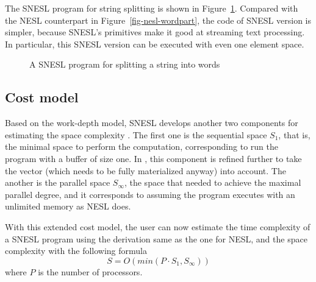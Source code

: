The SNESL program for string splitting is shown in Figure~\ref{fig-snesl-wordpart}. 
Compared with the NESL counterpart in Figure~\ref{fig-nesl-wordpart}, the code of SNESL version is simpler, because SNESL's primitives make it good at streaming text processing. 
In particular, this SNESL version can be executed with even one element space.
 
\begin{figure}[H]
	 
	\caption{{A SNESL program for splitting a string into words \label{fig-snesl-wordpart}}}
\end{figure}


\subsection{Cost model}

Based on the work-depth model, SNESL develops another two components for estimating the space complexity \cite{MadFil13}. 
The first one is the sequential space $S_1$, that is, the minimal space to perform the computation, corresponding to run the program with a buffer of size one. 
In \cite{Fphd}, this component is refined further to take the vector (which needs to be fully materialized anyway) into account.
The another is the parallel space $S_\infty$, the space that needed to achieve the maximal parallel degree, and it corresponds to assuming the program executes with an unlimited memory as NESL does.

With this extended cost model, the user can now estimate the time complexity of a SNESL program using the derivation same as the one for NESL, and the space complexity with the following formula
$$ S = O(min(P \cdot S_1, S_\infty)) $$
where $P$ is the number of processors.
	
%	
%
